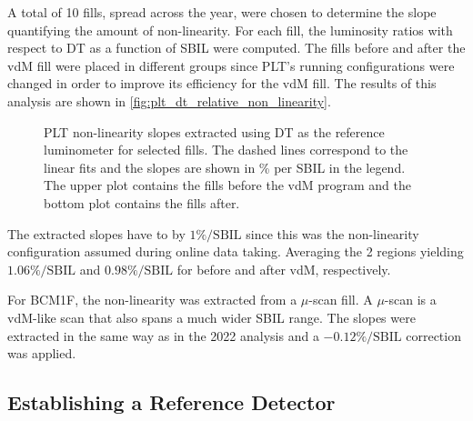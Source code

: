 A total of 10 fills, spread across the year, were chosen to determine the slope quantifying the amount of non-linearity. For each fill, the luminosity ratios with respect to DT as a function of SBIL were computed. The fills before and after the vdM fill were placed in different groups since PLT's running configurations were changed in order to improve its efficiency for the vdM fill. The results of this analysis are shown in \autoref{fig:plt_dt_relative_non_linearity}.

\begin{figure}[!htb]
	\centering
	\caption[PLT relative non-linearity slopes]{PLT non-linearity slopes extracted using DT as the reference luminometer for selected fills. The dashed lines correspond to the linear fits and the slopes are shown in \% per SBIL in the legend. The upper plot contains the fills before the vdM program and the bottom plot contains the fills after.}
	\label{fig:plt_dt_relative_non_linearity}
\end{figure}

The extracted slopes have to by $1\%/\text{SBIL}$ since this was the non-linearity configuration assumed during online data taking. Averaging the 2 regions yielding $1.06\%/\text{SBIL}$ and $0.98\%/\text{SBIL}$ for before and after vdM, respectively. 

For BCM1F, the non-linearity was extracted from a $\mu$-scan fill. A $\mu$-scan is a vdM-like scan that also spans a much wider SBIL range. The slopes were extracted in the same way as in the 2022 analysis \cite{CMS-PAS-LUM-22-001} and a $-0.12\%/\text{SBIL}$ correction was applied.

\subsection{Establishing a Reference Detector}

